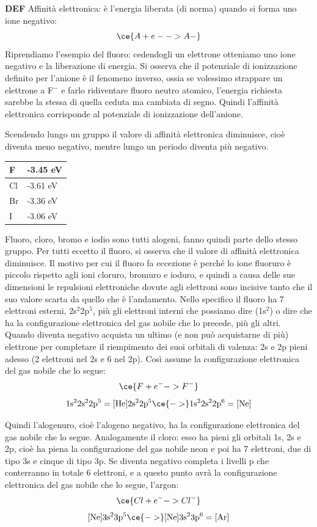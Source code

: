 \textbf{DEF} Affinità elettronica: è l'energia liberata (di norma) quando si forma uno ione negativo:
$$\ce{ A + e- -> A-}$$ 
Riprendiamo l'esempio del fluoro: cedendogli un elettrone otteniamo uno ione negativo e la liberazione di energia. Si osserva che il potenziale di ionizzazione definito per l'anione è il fenomeno inverso, ossia se volessimo strappare un elettrone a F$^-$ e farlo ridiventare fluoro neutro atomico, l'energia richiesta sarebbe la stessa di quella ceduta ma cambiata di segno. Quindi l'affinità elettronica corrisponde al potenziale di ionizzazione dell'anione.

Scendendo lungo un gruppo il valore di affinità elettronica diminuisce, cioè diventa meno negativo, mentre lungo un periodo diventa più negativo.
\begin{center}
    \begin{tabular}{ m{1cm}|m{2cm} } 
     F & -3.45 eV \\ 
     \hline
     Cl & -3.61 eV \\
     \hline
     Br & -3.36 eV \\ 
     \hline
     I & -3.06 eV \\
     \hline
    \end{tabular}
    \end{center}
Fluoro, cloro, bromo e iodio sono tutti alogeni, fanno quindi parte dello stesso gruppo. Per tutti eccetto il fluoro, si osserva che il valore di affinità elettronica diminuisce. Il motivo per cui il fluoro fa eccezione è perché lo ione fluoruro è piccolo rispetto agli ioni cloruro, bromuro e ioduro, e quindi a causa delle sue dimensioni le repulsioni elettroniche dovute agli elettroni sono incisive tanto che il suo valore scarta da quello che è l'andamento. Nello specifico il fluoro ha 7 elettroni esterni, 2s$^2$2p$^5$, più gli elettroni interni che possiamo dire (1s$^2$) o dire che ha la configurazione elettronica del gas nobile che lo precede, più gli altri. Quando diventa negativo acquista un ultimo (e non può acquistarne di più) elettrone per completare il riempimento dei suoi orbitali di valenza: 2s e 2p pieni adesso (2 elettroni nel 2s e 6 nel 2p). Così assume la configurazione elettronica del gas nobile che lo segue:
$$\ce{F + e^- -> F^-}$$
$$\rm 1s^22s^22p^5= [He]2s^22p^5\ce{->}1s^22s^22p^6=[Ne]$$

Quindi l'alogenuro, cioè l'alogeno negativo, ha la configurazione elettronica del gas nobile che lo segue. Analogamente il cloro: esso ha pieni gli orbitali 1s, 2s e 2p, cioè ha piena la configurazione del gas nobile neon e poi ha 7 elettroni, due di tipo 3s e cinque di tipo 3p. Se diventa negativo completa i livelli p che conterranno in totale 6 elettroni, e a questo punto avrà la configurazione elettronica del gas nobile che lo segue, l'argon:
$$\ce{Cl + e^- -> Cl^-}$$
$$\rm [Ne]3s^23p^5 \ce{->} [Ne]3s^23p^6=[Ar]$$

